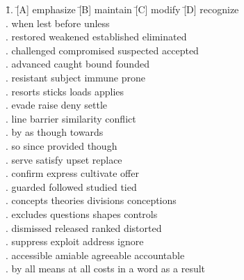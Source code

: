 \begin{tabbing}
\hspace{0cm}
\=1.  \quad\= [A] emphasize    \quad\quad\= [B] maintain    \quad\quad\= [C] modify      \quad\quad\= [D] recognize\\
.  \> [A] when         \> [B] lest         \> [C] before      \> [D] unless\\
.  \> [A] restored     \> [B] weakened     \> [C] established \> [D] eliminated\\
.  \> [A] challenged   \> [B] compromised  \> [C] suspected   \> [D] accepted\\
.  \> [A] advanced     \> [B] caught       \> [C] bound       \> [D] founded\\
.  \> [A] resistant    \> [B] subject      \> [C] immune      \> [D] prone\\
.  \> [A] resorts      \> [B] sticks       \> [C] loads       \> [D] applies\\
.  \> [A] evade        \> [B] raise        \> [C] deny        \> [D] settle\\
.  \> [A] line         \> [B] barrier      \> [C] similarity  \> [D] conflict\\
. \> [A] by           \> [B] as           \> [C] though      \> [D] towards\\
. \> [A] so           \> [B] since        \> [C] provided    \> [D] though\\
. \> [A] serve        \> [B] satisfy      \> [C] upset       \> [D] replace\\
. \> [A] confirm      \> [B] express      \> [C] cultivate   \> [D] offer\\
. \> [A] guarded      \> [B] followed     \> [C] studied     \> [D] tied\\
. \> [A] concepts     \> [B] theories     \> [C] divisions   \> [D] conceptions\\
. \> [A] excludes     \> [B] questions    \> [C] shapes      \> [D] controls\\
. \> [A] dismissed    \> [B] released     \> [C] ranked      \> [D] distorted\\
. \> [A] suppress     \> [B] exploit      \> [C] address     \> [D] ignore\\
. \> [A] accessible   \> [B] amiable      \> [C] agreeable   \> [D] accountable\\
. \> [A] by all means \> [B] at all costs \> [C] in a word   \> [D] as a result
\end{tabbing}
